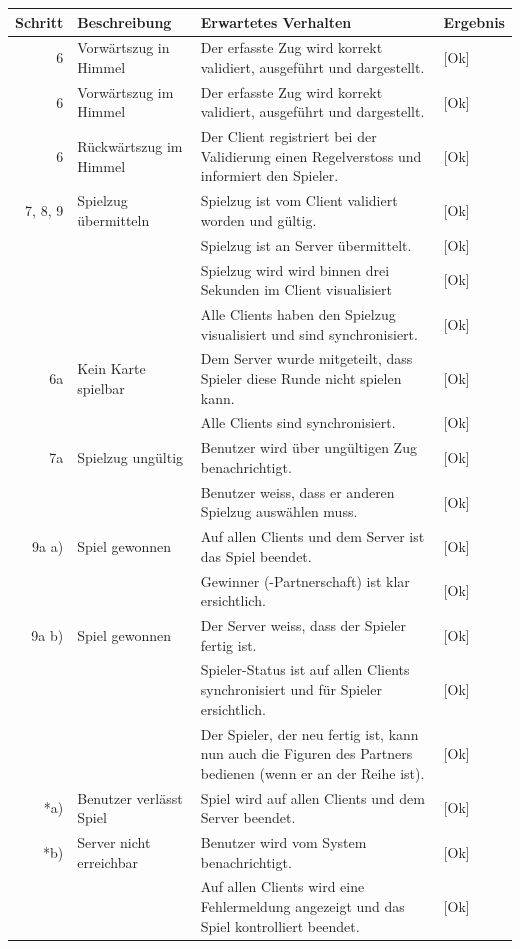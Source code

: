 \documentclass[12pt,halfparskip]{scrartcl}
\begin{document}
	\begin {tabular}{r | p{3cm} | p{8cm} | l}
		\toprule
		\textbf{Schritt} & \textbf{Beschreibung} & \textbf{Erwartetes Verhalten} & \textbf{Ergebnis} \\
		\midrule
		6 & Vorwärtszug in Himmel & Der erfasste Zug wird korrekt validiert, ausgeführt und dargestellt. & [Ok] \\
		\midrule
		6 & Vorwärtszug im Himmel & Der erfasste Zug wird korrekt validiert, ausgeführt und dargestellt. & [Ok] \\
		\midrule
		6 & Rückwärtszug im Himmel & Der Client registriert bei der Validierung einen Regelverstoss und informiert den Spieler. & [Ok] \\
		\midrule
		7, 8, 9 & Spielzug übermitteln & Spielzug ist vom Client validiert worden und gültig. & [Ok] \\
		 \cline{3-4} & & Spielzug ist an Server übermittelt. & [Ok] \\
		 \cline{3-4} & & Spielzug wird wird binnen drei Sekunden im Client visualisiert & [Ok] \\
		 \cline{3-4} & & Alle Clients haben den Spielzug visualisiert und sind synchronisiert. & [Ok] \\
		\midrule
		6a & Kein Karte spielbar & Dem Server wurde mitgeteilt, dass Spieler diese Runde nicht spielen kann. & [Ok] \\
		 \cline{3-4} & & Alle Clients sind synchronisiert. & [Ok] \\
		\midrule
		7a & Spielzug ungültig & Benutzer wird über ungültigen Zug benachrichtigt. & [Ok] \\
		 \cline{3-4} & & Benutzer weiss, dass er anderen Spielzug auswählen muss. & [Ok] \\
		\midrule
		9a a) & Spiel gewonnen & Auf allen Clients und dem Server ist das Spiel beendet. & [Ok] \\
		 \cline{3-4} & & Gewinner (-Partnerschaft) ist klar ersichtlich. & [Ok] \\
		\midrule
		9a b) & Spiel gewonnen & Der Server weiss, dass der Spieler fertig ist. & [Ok] \\
		 \cline{3-4} & & Spieler-Status ist auf allen Clients synchronisiert und für Spieler ersichtlich. & [Ok] \\
		 \cline{3-4} & & Der Spieler, der neu fertig ist, kann nun auch die Figuren des Partners bedienen (wenn er an der Reihe ist). & [Ok] \\
		\midrule
		*a) & Benutzer verlässt Spiel & Spiel wird auf allen Clients und dem Server beendet. & [Ok] \\
		\midrule
		*b) & Server nicht erreichbar & Benutzer wird vom System benachrichtigt. & [Ok] \\
		 \cline{3-4} & & Auf allen Clients wird eine Fehlermeldung angezeigt und das Spiel kontrolliert beendet. & [Ok] \\
		\bottomrule
	\end{tabular}
	
\end{document}
